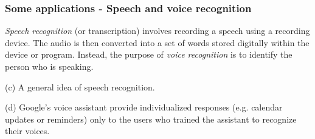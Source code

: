 \documentclass{beamer}
\begin{document}
	\begin{frame}
		\frametitle{Some applications - Speech and voice recognition}
		\textit{Speech recognition} (or transcription) involves recording a speech using a recording device. The audio is then converted into a set of words stored digitally within the device or program. Instead, the purpose of \textit{voice recognition} is to identify the person who is speaking.
		\begin{figure}
			\centering
			\qquad
		\end{figure}
	(c) A general idea of speech recognition. 
	
	(d) Google’s voice assistant provide individualized responses (e.g. calendar updates or reminders) only to the users who trained the assistant to recognize their voices.
	
	\end{frame}
\end{document}
